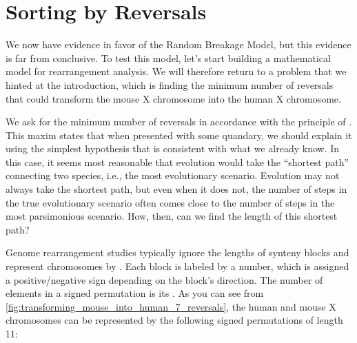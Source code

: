 \begin{qbox}\end{qbox}

\vspace{-2\baselineskip}

\FloatBarrier
\section{Sorting by Reversals}
\label{sec:sorting_by_reversals}

We now have evidence in favor of the Random Breakage Model, but this evidence is far from conclusive.  To test this model, let's start building a mathematical model for rearrangement analysis.  We will therefore return to a problem that we hinted at the introduction, which is finding the minimum number of reversals that could transform the mouse X chromosome into the human X chromosome.\\

\begin{qbox}\end{qbox}

\noindent We ask for the minimum number of reversals in accordance with the principle of . This maxim states that when presented with some quandary, we should explain it using the simplest hypothesis that is consistent with what we already know. In this case, it seems most reasonable that evolution would take the ``shortest path'' connecting two species, i.e., the most  evolutionary scenario. Evolution may not always take the shortest path, but even when it does not, the number of steps in the true evolutionary scenario often comes close to the number of steps in the most parsimonious scenario.  How, then, can we find the length of this shortest path?

Genome rearrangement studies typically ignore the lengths of synteny blocks and represent chromosomes by . Each block is labeled by a number, which is assigned a positive/negative sign depending on the block's direction.  The number of elements in a signed permutation is its . As you can see from \autoref{fig:transforming_mouse_into_human_7_reversals}, the human and mouse X chromosomes can be represented by the following signed permutations of length 11:

